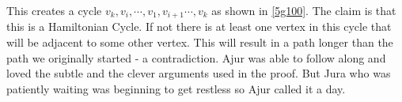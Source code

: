 This creates a cycle $v_k,v_i,\cdots,v_1,v_{i+1}\cdots, v_k$ as shown in \ref{5g100}. The claim is that this is a Hamiltonian Cycle. If not there is at least one vertex in this cycle that will be adjacent to some other vertex. This will result in a path longer than the path we originally started - a contradiction.
Ajur was able to follow along and loved the subtle and the clever arguments used in the proof. But Jura who was patiently waiting was beginning to get restless so Ajur called it a day.
